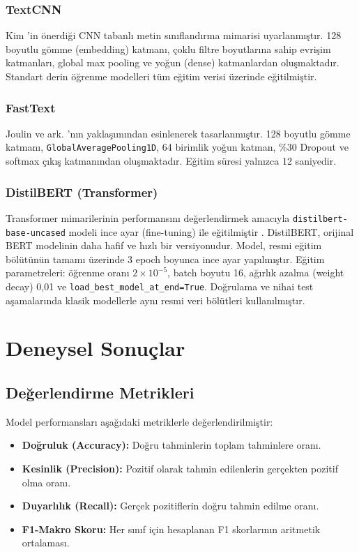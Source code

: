 \documentclass[conference]{IEEEtran}
\begin{document}
\subsubsection{TextCNN}
Kim \cite{kim2014convolutional}'in önerdiği CNN tabanlı metin sınıflandırma mimarisi uyarlanmıştır. 128 boyutlu gömme (embedding) katmanı, çoklu filtre boyutlarına sahip evrişim katmanları, global max pooling ve yoğun (dense) katmanlardan oluşmaktadır. Standart derin öğrenme modelleri tüm eğitim verisi üzerinde eğitilmiştir.

\subsubsection{FastText}
Joulin ve ark. \cite{joulin2017bag}'nın yaklaşımından esinlenerek tasarlanmıştır. 128 boyutlu gömme katmanı, \texttt{GlobalAveragePooling1D}, 64 birimlik yoğun katman, \%30 Dropout ve softmax çıkış katmanından oluşmaktadır. Eğitim süresi yalnızca 12 saniyedir.

\subsubsection{DistilBERT (Transformer)}
Transformer mimarilerinin performansını değerlendirmek amacıyla \texttt{distilbert-base-uncased} modeli ince ayar (fine-tuning) ile eğitilmiştir \cite{sanh2019distilbert}. DistilBERT, orijinal BERT modelinin daha hafif ve hızlı bir versiyonudur. Model, resmi eğitim bölütünün tamamı üzerinde 3 epoch boyunca ince ayar yapılmıştır. Eğitim parametreleri: öğrenme oranı $2 \times 10^{-5}$, batch boyutu 16, ağırlık azalma (weight decay) 0,01 ve \texttt{load\_best\_model\_at\_end=True}. Doğrulama ve nihai test aşamalarında klasik modellerle aynı resmi veri bölütleri kullanılmıştır.

\section{Deneysel Sonuçlar}
\label{sec:deneysel}

\subsection{Değerlendirme Metrikleri}
Model performansları aşağıdaki metriklerle değerlendirilmiştir:

\begin{itemize}
    \item \textbf{Doğruluk (Accuracy):} Doğru tahminlerin toplam tahminlere oranı.
    \item \textbf{Kesinlik (Precision):} Pozitif olarak tahmin edilenlerin gerçekten pozitif olma oranı.
    \item \textbf{Duyarlılık (Recall):} Gerçek pozitiflerin doğru tahmin edilme oranı.
    \item \textbf{F1-Makro Skoru:} Her sınıf için hesaplanan F1 skorlarının aritmetik ortalaması.
\end{itemize}
\end{document}

